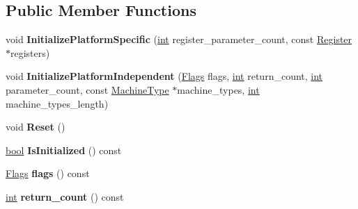 \subsection*{Public Member Functions}
\begin{DoxyCompactItemize}
\item 
\mbox{\label{classv8_1_1internal_1_1CallInterfaceDescriptorData_aad2f5b2d12f64ad4ab18eb559406b142}} 
void {\bfseries Initialize\+Platform\+Specific} (\mbox{\hyperlink{classint}{int}} register\+\_\+parameter\+\_\+count, const \mbox{\hyperlink{classv8_1_1internal_1_1Register}{Register}} $\ast$registers)
\item 
\mbox{\label{classv8_1_1internal_1_1CallInterfaceDescriptorData_a83c8a2ff13a423c2808b02c933bcacdb}} 
void {\bfseries Initialize\+Platform\+Independent} (\mbox{\hyperlink{classv8_1_1base_1_1Flags}{Flags}} flags, \mbox{\hyperlink{classint}{int}} return\+\_\+count, \mbox{\hyperlink{classint}{int}} parameter\+\_\+count, const \mbox{\hyperlink{classv8_1_1internal_1_1MachineType}{Machine\+Type}} $\ast$machine\+\_\+types, \mbox{\hyperlink{classint}{int}} machine\+\_\+types\+\_\+length)
\item 
\mbox{\label{classv8_1_1internal_1_1CallInterfaceDescriptorData_ad26cc53293db18880e956eccbb6fa00e}} 
void {\bfseries Reset} ()
\item 
\mbox{\label{classv8_1_1internal_1_1CallInterfaceDescriptorData_ad64c17585b21c990357a8c9bd683509c}} 
\mbox{\hyperlink{classbool}{bool}} {\bfseries Is\+Initialized} () const
\item 
\mbox{\label{classv8_1_1internal_1_1CallInterfaceDescriptorData_ac56d142cde4db9306f0ebab6ae01c148}} 
\mbox{\hyperlink{classv8_1_1base_1_1Flags}{Flags}} {\bfseries flags} () const
\item 
\mbox{\label{classv8_1_1internal_1_1CallInterfaceDescriptorData_a3b7f4dec26414fd42459ba66d28dd975}} 
\mbox{\hyperlink{classint}{int}} {\bfseries return\+\_\+count} () const
\item 

\end{DoxyCompactItemize}
